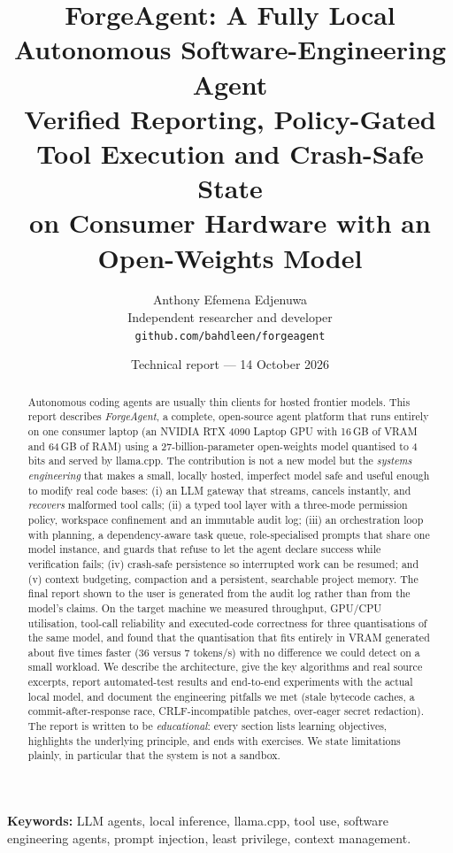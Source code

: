 \documentclass[11pt,a4paper]{article}
\title{\bfseries ForgeAgent: A Fully Local Autonomous Software-Engineering Agent\\[2pt]
\large Verified Reporting, Policy-Gated Tool Execution and Crash-Safe State\\ on Consumer Hardware with an Open-Weights Model}
\author{Anthony Efemena Edjenuwa\\[2pt]\small Independent researcher and developer\\[2pt]\small\texttt{github.com/bahdleen/forgeagent}}
\date{Technical report --- 14 October 2026}
\begin{document}
\maketitle

\begin{abstract}
\noindent
Autonomous coding agents are usually thin clients for hosted frontier models. This report describes \emph{ForgeAgent}, a complete,
open-source agent platform that runs entirely on one consumer laptop (an NVIDIA RTX 4090 Laptop GPU with 16\,GB of VRAM and 64\,GB of RAM)
using a 27-billion-parameter open-weights model quantised to 4 bits and served by llama.cpp. The contribution is not a new model but the
\emph{systems engineering} that makes a small, locally hosted, imperfect model safe and useful enough to modify real code bases:
(i) an LLM gateway that streams, cancels instantly, and \emph{recovers} malformed tool calls; (ii) a typed tool layer with a three-mode permission
policy, workspace confinement and an immutable audit log; (iii) an orchestration loop with planning, a dependency-aware task queue, role-specialised
prompts that share one model instance, and guards that refuse to let the agent declare success while verification fails;
(iv) crash-safe persistence so interrupted work can be resumed; and (v) context budgeting, compaction and a persistent, searchable project memory.
The final report shown to the user is generated from the audit log rather than from the model's claims.
On the target machine we measured throughput, GPU/CPU utilisation, tool-call reliability and executed-code correctness for three quantisations of the same model, and found that the quantisation that fits entirely in VRAM generated about five times faster (36 versus 7 tokens/s) with no difference we could detect on a small workload.
We describe the architecture, give the key algorithms and real source excerpts, report automated-test results and end-to-end
experiments with the actual local model, and document the engineering pitfalls we met (stale bytecode caches, a commit-after-response race,
CRLF-incompatible patches, over-eager secret redaction). The report is written to be \emph{educational}: every section lists learning objectives,
highlights the underlying principle, and ends with exercises. We state limitations plainly, in particular that the system is not a sandbox.
\end{abstract}

\noindent\textbf{Keywords:} LLM agents, local inference, llama.cpp, tool use, software engineering agents, prompt injection, least privilege, context management.
\end{document}
